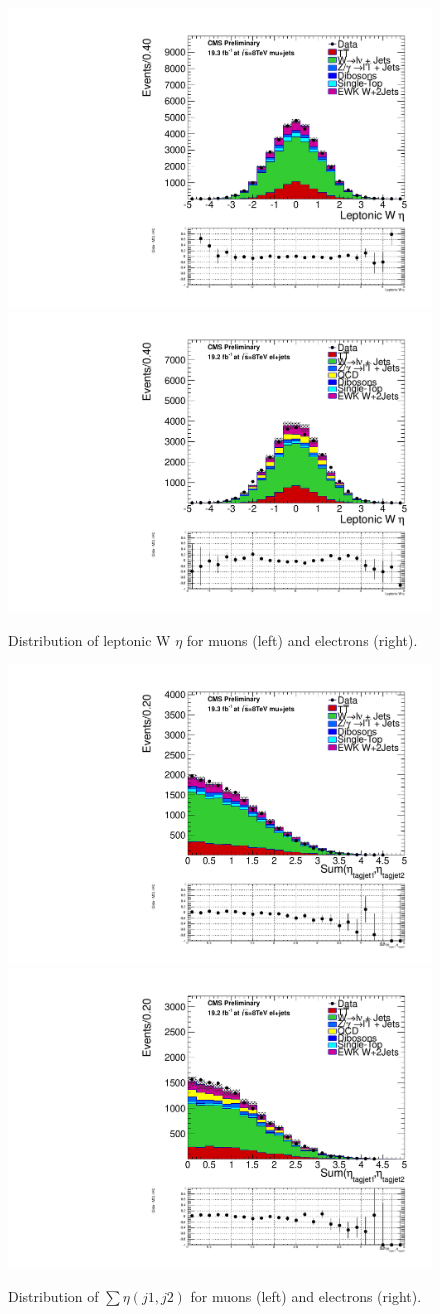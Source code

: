 \begin{figure}[ht]
\centerline{
      \includegraphics[width=.49\textwidth]{figs/n-1_plots_mu/mu_EWK_W_2jets_W_eta_mjj_600_tagjet1_60_tagjet2_50_Zeppenfield_1point2_EWKW2jets.pdf}
      \includegraphics[width=.49\textwidth]{figs/n-1_plots_el/el_EWK_W_2jets_W_eta_mjj_600_tagjet1_60_tagjet2_50_Zeppenfield_1point2_met_30_WmT_30_EWKW2jets.pdf}
}
\caption{Distribution of leptonic W $\eta$ for muons (left) and electrons (right).}
\label{fig:lepw_eta}
\end{figure}

\begin{figure}[ht]
\centerline{
   \includegraphics[width=.49\textwidth]{figs/n-1_plots_mu/mu_EWK_W_2jets_tagjet_sumeta_mjj_600_tagjet1_60_tagjet2_50_Zeppenfield_1point2_EWKW2jets.pdf}
   \includegraphics[width=.49\textwidth]{figs/n-1_plots_el/el_EWK_W_2jets_tagjet_sumeta_mjj_600_tagjet1_60_tagjet2_50_Zeppenfield_1point2_met_30_WmT_30_EWKW2jets.pdf}
}
\caption{Distribution of $\sum \eta(j1,j2)$ for muons (left) and electrons (right).}
\label{fig:sumeta}
\end{figure}

